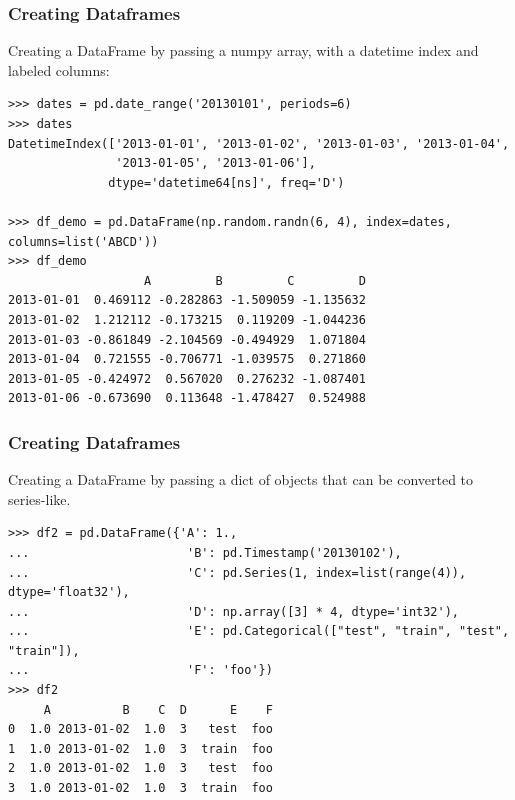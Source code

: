 \begin{frame}[fragile]\frametitle{Creating Dataframes}
Creating a DataFrame by passing a numpy array, with a datetime index and labeled columns:
\begin{lstlisting}
>>> dates = pd.date_range('20130101', periods=6)
>>> dates
DatetimeIndex(['2013-01-01', '2013-01-02', '2013-01-03', '2013-01-04',
               '2013-01-05', '2013-01-06'],
              dtype='datetime64[ns]', freq='D')

>>> df_demo = pd.DataFrame(np.random.randn(6, 4), index=dates, columns=list('ABCD'))
>>> df_demo
                   A         B         C         D
2013-01-01  0.469112 -0.282863 -1.509059 -1.135632
2013-01-02  1.212112 -0.173215  0.119209 -1.044236
2013-01-03 -0.861849 -2.104569 -0.494929  1.071804
2013-01-04  0.721555 -0.706771 -1.039575  0.271860
2013-01-05 -0.424972  0.567020  0.276232 -1.087401
2013-01-06 -0.673690  0.113648 -1.478427  0.524988
\end{lstlisting}
\end{frame}


\begin{frame}[fragile]\frametitle{Creating Dataframes}
Creating a DataFrame by passing a dict of objects that can be converted to series-like.
\begin{lstlisting}
>>> df2 = pd.DataFrame({'A': 1.,
...                      'B': pd.Timestamp('20130102'),
...                      'C': pd.Series(1, index=list(range(4)), dtype='float32'),
...                      'D': np.array([3] * 4, dtype='int32'),
...                      'E': pd.Categorical(["test", "train", "test", "train"]),
...                      'F': 'foo'})
>>> df2
     A          B    C  D      E    F
0  1.0 2013-01-02  1.0  3   test  foo
1  1.0 2013-01-02  1.0  3  train  foo
2  1.0 2013-01-02  1.0  3   test  foo
3  1.0 2013-01-02  1.0  3  train  foo
\end{lstlisting}
\end{frame}

